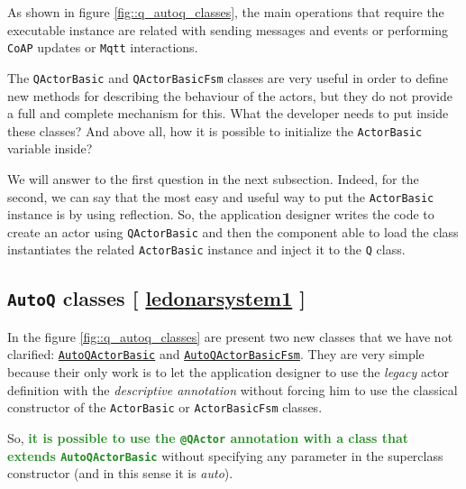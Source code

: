As shown in figure \ref{fig::q_autoq_classes}, the main operations that require the executable instance are related with sending messages and events or performing \texttt{CoAP} updates or \texttt{Mqtt} interactions.

The \texttt{QActorBasic} and \texttt{QActorBasicFsm} classes are very useful in order to define new methods for describing the behaviour of the actors, but they do not provide a full and complete mechanism for this.
What the developer needs to put inside these classes? And above all, how it is possible to initialize the \texttt{ActorBasic} variable inside?

We will answer to the first question in the next subsection. Indeed, for the second, we can say that the most easy and useful way to put the \texttt{ActorBasic} instance is by using reflection. So, the application designer writes the code to create an actor using \texttt{QActorBasic} and then the component able to load the class instantiates the related \texttt{ActorBasic} instance and inject it to the \texttt{Q} class.

\subsection{\texttt{AutoQ} classes  [ \href{https://github.com/LM-96/QA-Extensions/tree/main/it.unibo.ledsonardemo1}{\textcolor{Emerald}{\textbf{ledonarsystem1}}} ]}

In the figure \ref{fig::q_autoq_classes} are present two new classes that we have not clarified: \href{https://github.com/LM-96/QA-Extensions/blob/main/it.unibo.qakactor/src/main/kotlin/AutoQActorBasic.kt}{\texttt{AutoQActorBasic}} and \href{https://github.com/LM-96/QA-Extensions/blob/main/it.unibo.qakactor/src/main/kotlin/AutoQActorBasicFsm.kt}{\texttt{AutoQActorBasicFsm}}. They are very simple because their only work is to let the application designer to use the \textit{legacy} actor definition with the \textit{descriptive annotation} without forcing him to use the classical constructor of the \texttt{ActorBasic} or \texttt{ActorBasicFsm} classes.

So, \textcolor{ForestGreen}{\textbf{it is possible to use the \texttt{@QActor} annotation with a class that extends \texttt{AutoQActorBasic}}} without specifying any parameter in the superclass constructor (and in this sense it is \textit{auto}).

